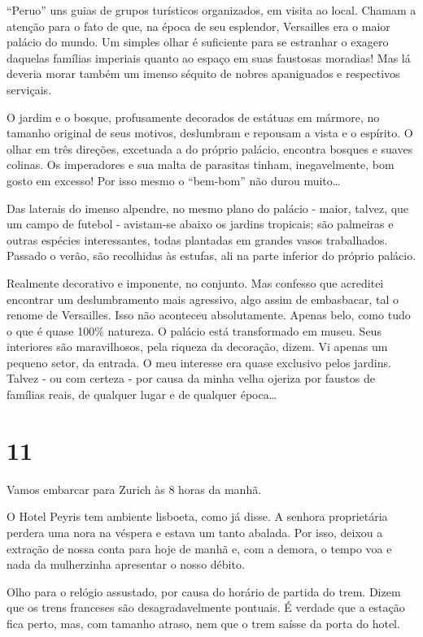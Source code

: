 ``Peruo'' uns guias de grupos turísticos organizados, em visita ao local. Chamam a atenção para o fato de que, na época de seu esplendor, Versailles era o maior palácio do mundo. Um simples olhar é suficiente para se estranhar o exagero daquelas famílias imperiais quanto ao espaço em suas faustosas moradias! Mas lá deveria morar também um imenso séquito de nobres apaniguados e respectivos serviçais.

O jardim e o bosque, profusamente decorados de estátuas em mármore, no tamanho original de seus motivos, deslumbram e repousam a vista e o espírito. O olhar em três direções, excetuada a do próprio palácio, encontra bosques e suaves colinas. Os imperadores e sua malta de parasitas tinham, inegavelmente, bom gosto em excesso! Por isso mesmo o ``bem-bom'' não durou muito\ldots

Das laterais do imenso alpendre, no mesmo plano do palácio - maior, talvez, que um campo de futebol - avistam-se abaixo os jardins tropicais; são palmeiras e outras espécies interessantes, todas plantadas em grandes vasos trabalhados. Passado o verão, são recolhidas às estufas, ali na parte inferior do próprio palácio.

Realmente decorativo e imponente, no conjunto. Mas confesso que acreditei encontrar um deslumbramento mais agressivo, algo assim de embasbacar, tal o renome de Versailles. Isso não aconteceu absolutamente. Apenas belo, como tudo o que é quase 100\% natureza. O palácio está transformado em museu. Seus interiores são maravilhosos, pela riqueza da decoração, dizem. Vi apenas um pequeno setor, da entrada. O meu interesse era quase exclusivo pelos jardins. Talvez - ou com certeza - por causa da minha velha ojeriza por faustos de famílias reais, de qualquer lugar e de qualquer época\ldots

\section*{11 \adfflatleafright {}}
Vamos embarcar para Zurich às 8 horas da manhã.

O Hotel Peyris tem ambiente lisboeta, como já disse. A senhora proprietária perdera uma nora na véspera e estava um tanto abalada. Por isso, deixou a extração de nossa conta para hoje de manhã e, com a demora, o tempo voa e nada da mulherzinha apresentar o nosso débito.

Olho para o relógio assustado, por causa do horário de partida do trem. Dizem que os trens franceses são desagradavelmente pontuais. É verdade que a estação fica perto, mas, com tamanho atraso, nem que o trem saísse da porta do hotel.

